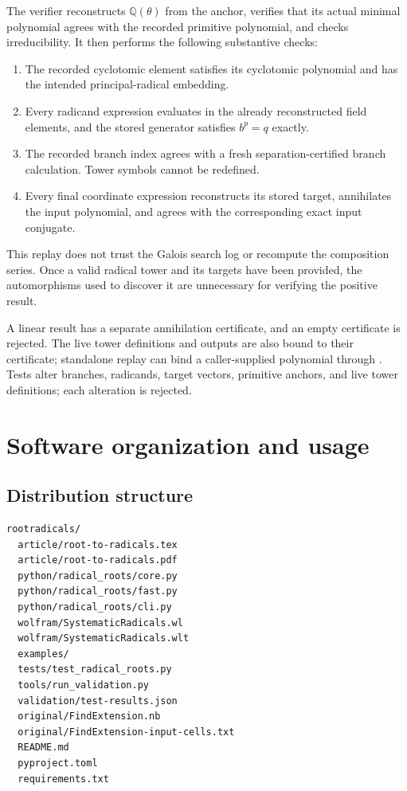 \documentclass[11pt,a4paper]{article}
\newcommand{\Q}{\mathbb Q}
\newcommand{\code}[1]{\texttt{\detokenize{#1}}}
\theoremstyle{definition}
\theoremstyle{remark}
\begin{document}
The verifier reconstructs $\Q(\theta)$ from the anchor, verifies that its actual minimal polynomial agrees with the recorded primitive polynomial, and checks irreducibility. It then performs the following substantive checks:
\begin{enumerate}[label=\arabic*.,leftmargin=*,itemsep=2pt]
\item The recorded cyclotomic element satisfies its cyclotomic polynomial and has the intended principal-radical embedding.
\item Every radicand expression evaluates in the already reconstructed field elements, and the stored generator satisfies $b^p=q$ exactly.
\item The recorded branch index agrees with a fresh separation-certified branch calculation. Tower symbols cannot be redefined.
\item Every final coordinate expression reconstructs its stored target, annihilates the input polynomial, and agrees with the corresponding exact input conjugate.
\end{enumerate}
This replay does not trust the Galois search log or recompute the composition series. Once a valid radical tower and its targets have been provided, the automorphisms used to discover it are unnecessary for verifying the positive result.

A linear result has a separate annihilation certificate, and an empty certificate is rejected. The live tower definitions and outputs are also bound to their certificate; standalone replay can bind a caller-supplied polynomial through \code{expected_polynomial}. Tests alter branches, radicands, target vectors, primitive anchors, and live tower definitions; each alteration is rejected.

\section{Software organization and usage}\label{sec:software}

\subsection{Distribution structure}

\begin{lstlisting}
rootradicals/
  article/root-to-radicals.tex
  article/root-to-radicals.pdf
  python/radical_roots/core.py
  python/radical_roots/fast.py
  python/radical_roots/cli.py
  wolfram/SystematicRadicals.wl
  wolfram/SystematicRadicals.wlt
  examples/
  tests/test_radical_roots.py
  tools/run_validation.py
  validation/test-results.json
  original/FindExtension.nb
  original/FindExtension-input-cells.txt
  README.md
  pyproject.toml
  requirements.txt
\end{lstlisting}
\end{document}
